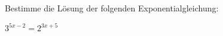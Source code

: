 
Bestimme die Lösung der folgenden Exponentialgleichung:

\begin{math}
	3^{5x-2} = 2^{3x+5}
\end{math}